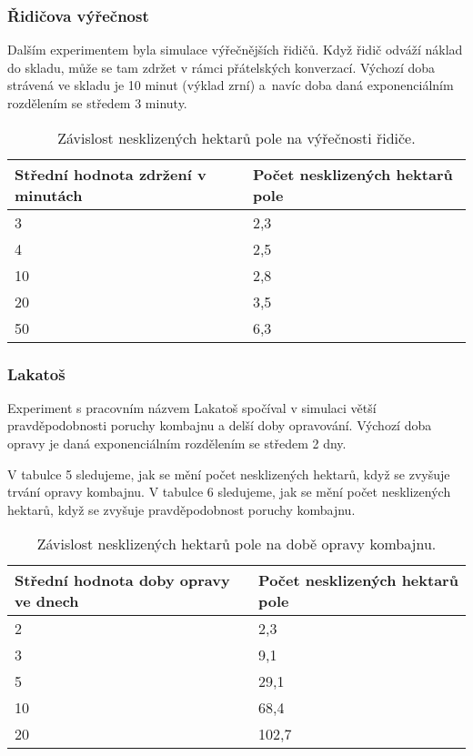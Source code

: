 \documentclass[a4paper, 11pt, hidelinks]{article}
\begin{document}
\subsubsection{Řidičova výřečnost}\label{4_2_2_vykecavani}

Dalším experimentem byla simulace výřečnějších řidičů.
Když řidič odváží náklad do skladu, může se tam zdržet v rámci přátelských konverzací.
Výchozí doba strávená ve skladu je 10 minut (výklad zrní) a~navíc doba daná exponenciálním rozdělením se středem 3 minuty.

\begin{table}[ht]
    \centering
    \begin{tabularx}{\textwidth}{|X|X|}
      \hline
      \textbf{Střední hodnota zdržení v minutách} & \textbf{Počet nesklizených hektarů pole} \\
      \hline
      3 & 2,3 \\
      \hline
      4 & 2,5 \\
      \hline
      10 & 2,8 \\
      \hline
      20 & 3,5 \\
      \hline
      50 & 6,3 \\
      \hline
    \end{tabularx}
    \caption{Závislost nesklizených hektarů pole na výřečnosti řidiče.}
    \label{tab:vykecavani}
\end{table}

\subsubsection{Lakatoš}\label{4_2_3_lakatos}

Experiment s pracovním názvem Lakatoš spočíval v simulaci větší pravděpodobnosti poruchy kombajnu a delší doby opravování.
Výchozí doba opravy je daná exponenciálním rozdělením se středem 2 dny.

V tabulce 5 sledujeme, jak se mění počet nesklizených hektarů, když se zvyšuje trvání opravy kombajnu.
V tabulce 6 sledujeme, jak se mění počet nesklizených hektarů, když se zvyšuje pravděpodobnost poruchy kombajnu.

\newpage

\begin{table}[ht]
    \centering
    \begin{tabularx}{\textwidth}{|X|X|}
      \hline
      \textbf{Střední hodnota doby opravy ve dnech} & \textbf{Počet nesklizených hektarů pole} \\
      \hline
      2 & 2,3 \\
      \hline
      3 & 9,1 \\
      \hline
      5 & 29,1 \\
      \hline
      10 & 68,4 \\
      \hline
      20 & 102,7 \\
      \hline
    \end{tabularx}
    \caption{Závislost nesklizených hektarů pole na době opravy kombajnu.}
    \label{tab:lakatos1}
\end{table}
\end{document}

